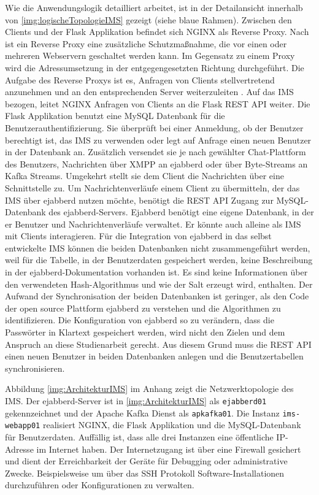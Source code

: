 \documentclass[a4paper,titlepage,halfparskip,12pt]{scrreprt}
\begin{document}
\begin{onehalfspacing}
Wie die Anwendungslogik detailliert arbeitet, ist in der Detailansicht innerhalb von \autoref{img:logischeTopologieIMS} gezeigt (siehe blaue Rahmen). Zwischen den Clients und der Flask Applikation befindet sich NGINX als Reverse Proxy. Nach \cite{reverseProxyDesc} ist ein Reverse Proxy eine zusätzliche Schutzmaßnahme, die vor einen oder mehreren Webservern geschaltet werden kann. Im Gegensatz zu einem Proxy wird die Adressumsetzung in der entgegengesetzten Richtung durchgeführt.
Die Aufgabe des Reverse Proxys ist es, Anfragen von Clients stellvertretend anzunehmen und an den entsprechenden Server weiterzuleiten \cite{reverseProxyDesc}. Auf das \ac{IMS} bezogen, leitet NGINX Anfragen von Clients an die Flask \acs{REST} \acs{API} weiter. Die Flask Applikation benutzt eine MySQL Datenbank für die Benutzerauthentifizierung. Sie überprüft bei einer Anmeldung, ob der Benutzer berechtigt ist, das \ac{IMS} zu verwenden oder legt auf Anfrage einen neuen Benutzer in der Datenbank an. Zusätzlich versendet sie je nach gewählter Chat-Plattform des Benutzers, Nachrichten über \ac{XMPP} an ejabberd oder über Byte-Streams an Kafka Streams. Umgekehrt stellt sie dem Client die Nachrichten über eine Schnittstelle zu. Um Nachrichtenverläufe einem Client zu übermitteln, der das \ac{IMS} über ejabberd nutzen möchte, benötigt die \acs{REST} \acs{API} Zugang zur MySQL-Datenbank des ejabberd-Servers. Ejabberd benötigt eine eigene Datenbank, in der er Benutzer und Nachrichtenverläufe verwaltet. Er könnte auch alleine als \ac{IMS} mit Clients interagieren. Für die Integration von ejabberd in das selbst entwickelte \ac{IMS} können die beiden Datenbanken nicht zusammengeführt werden, weil für die Tabelle, in der Benutzerdaten gespeichert werden, keine Beschreibung in der ejabberd-Dokumentation vorhanden ist. Es sind keine Informationen über den verwendeten Hash-Algorithmus und wie der Salt erzeugt wird, enthalten. Der Aufwand der Synchronisation der beiden Datenbanken ist geringer, als den Code der open source Plattform ejabberd zu verstehen und die Algorithmen zu identifizieren. Die Konfiguration von ejabberd so zu verändern, dass die Passwörter in Klartext gespeichert werden, wird nicht den Zielen und dem Anspruch an diese Studienarbeit gerecht. Aus diesem Grund muss die \acs{REST} \acs{API} einen neuen Benutzer in beiden Datenbanken anlegen und die Benutzertabellen synchronisieren.

Abbildung \autoref{img:ArchitekturIMS} im Anhang zeigt die Netzwerktopologie des \ac{IMS}. Der ejabberd-Server ist in \autoref{img:ArchitekturIMS} als \texttt{ejabberd01} gekennzeichnet und der Apache Kafka Dienst als \texttt{apkafka01}. Die Instanz \texttt{ims-webapp01} realisiert NGINX, die Flask Applikation und die MySQL-Datenbank für Benutzerdaten. Auffällig ist, dass alle drei Instanzen eine öffentliche IP-Adresse im Internet haben. Der Internetzugang ist über eine Firewall gesichert und dient der Erreichbarkeit der Geräte für Debugging oder administrative Zwecke. Beispielsweise um über das \ac{SSH} Protokoll Software-Installationen durchzuführen oder Konfigurationen zu verwalten.


\end{onehalfspacing}
\end{document}
